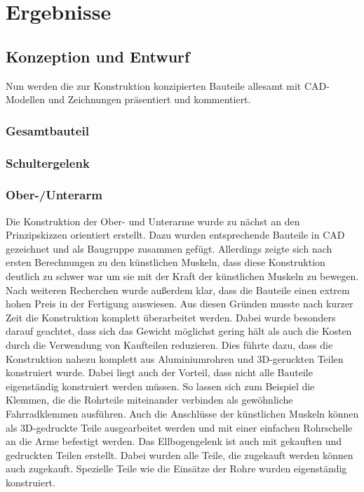 \chapter{Ergebnisse}
	\section{Konzeption und Entwurf}
		Nun werden die zur Konstruktion konzipierten Bauteile allesamt mit CAD-Modellen und Zeichnungen präsentiert und kommentiert.
		\subsection{Gesamtbauteil}
		\subsection{Schultergelenk}
		\subsection{Ober-/Unterarm}
		Die Konstruktion der Ober- und Unterarme wurde zu nächst an den Prinzipskizzen orientiert erstellt. Dazu wurden entsprechende Bauteile in CAD gezeichnet und als Baugruppe zusammen gefügt. Allerdings zeigte sich nach ersten Berechnungen zu den künstlichen Muskeln, dass diese Konstruktion deutlich zu schwer war um sie mit der Kraft der künstlichen Muskeln zu bewegen. Nach weiteren Recherchen wurde außerdem klar, dass die Bauteile einen extrem hohen Preis in der Fertigung auswiesen. Aus diesen Gründen musste nach kurzer Zeit die Konstruktion komplett überarbeitet werden. Dabei wurde besonders darauf geachtet, dass sich das Gewicht möglichst gering hält als auch die Kosten durch die Verwendung von Kaufteilen reduzieren. Dies führte dazu, dass die Konstruktion nahezu komplett aus Aluminiumrohren und 3D-geruckten Teilen konstruiert wurde. Dabei liegt auch der Vorteil, dass nicht alle Bauteile eigenständig konstruiert werden müssen. So lassen sich zum Beispiel die Klemmen, die die Rohrteile miteinander verbinden als gewöhnliche Fahrradklemmen ausführen. Auch die Anschlüsse der künstlichen Muskeln können als 3D-gedruckte Teile ausgearbeitet werden und mit einer einfachen Rohrschelle an die Arme befestigt werden. Das Ellbogengelenk ist auch mit gekauften und gedruckten Teilen erstellt. Dabei wurden alle Teile, die zugekauft werden können auch zugekauft. Spezielle Teile wie die Einsätze der Rohre wurden eigenständig konstruiert. 
